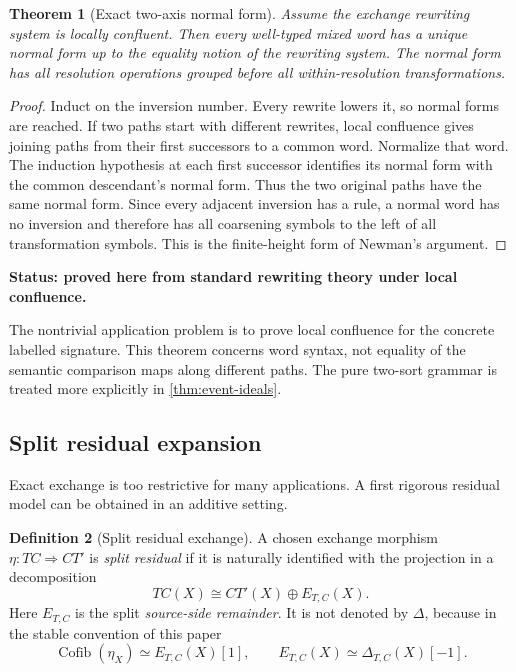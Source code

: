 \documentclass[11pt]{article}
\newtheorem{theorem}{Theorem}[section]
\theoremstyle{definition}
\newtheorem{definition}[theorem]{Definition}
\theoremstyle{remark}
\newcommand{\Cofib}{\operatorname{Cofib}}
\newcommand{\status}[1]{\textbf{Status: #1.}}
\begin{document}
\begin{theorem}[Exact two-axis normal form]\label{thm:normal-form}
Assume the exchange rewriting system is locally confluent. Then every well-typed mixed word has a unique normal form up to the equality notion of the rewriting system. The normal form has all resolution operations grouped before all within-resolution transformations.
\end{theorem}

\begin{proof}
Induct on the inversion number. Every rewrite lowers it, so normal forms are reached. If two paths start with different rewrites, local confluence gives joining paths from their first successors to a common word. Normalize that word. The induction hypothesis at each first successor identifies its normal form with the common descendant's normal form. Thus the two original paths have the same normal form. Since every adjacent inversion has a rule, a normal word has no inversion and therefore has all coarsening symbols to the left of all transformation symbols. This is the finite-height form of Newman's argument.
\end{proof}

\status{proved here from standard rewriting theory under local confluence}

The nontrivial application problem is to prove local confluence for the concrete labelled signature. This theorem concerns word syntax, not equality of the semantic comparison maps along different paths. The pure two-sort grammar is treated more explicitly in \cref{thm:event-ideals}.

\subsection{Split residual expansion}

Exact exchange is too restrictive for many applications. A first rigorous residual model can be obtained in an additive setting.

\begin{definition}[Split residual exchange]
A chosen exchange morphism $\eta:TC\Rightarrow CT'$ is \emph{split residual} if it is naturally identified with the projection in a decomposition
\[
TC(X)\cong CT'(X)\oplus E_{T,C}(X).
\]
Here $E_{T,C}$ is the split \emph{source-side remainder}. It is not denoted by $\Delta$, because in the stable convention of this paper
\[
\Cofib(\eta_X)\simeq E_{T,C}(X)[1],
\qquad E_{T,C}(X)\simeq\Delta_{T,C}(X)[-1].
\]
\end{definition}
\end{document}
